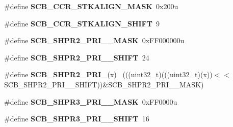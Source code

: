 \begin{DoxyCompactItemize}
\item 
\hypertarget{group___s_c_b___register___masks_ga41747ff80ad3657bcfa98a306feeee9d}{}\#define {\bfseries S\+C\+B\+\_\+\+C\+C\+R\+\_\+\+S\+T\+K\+A\+L\+I\+G\+N\+\_\+\+M\+A\+S\+K}~0x200u\label{group___s_c_b___register___masks_ga41747ff80ad3657bcfa98a306feeee9d}

\item 
\hypertarget{group___s_c_b___register___masks_ga217ffb9b976391961423e4a0802fbe66}{}\#define {\bfseries S\+C\+B\+\_\+\+C\+C\+R\+\_\+\+S\+T\+K\+A\+L\+I\+G\+N\+\_\+\+S\+H\+I\+F\+T}~9\label{group___s_c_b___register___masks_ga217ffb9b976391961423e4a0802fbe66}

\item 
\hypertarget{group___s_c_b___register___masks_ga3d791e5cf57bac7bf773150ba1f0683e}{}\#define {\bfseries S\+C\+B\+\_\+\+S\+H\+P\+R2\+\_\+\+P\+R\+I\+\_\+\_\+\+M\+A\+S\+K}~0x\+F\+F000000u\label{group___s_c_b___register___masks_ga3d791e5cf57bac7bf773150ba1f0683e}

\item 
\hypertarget{group___s_c_b___register___masks_ga4ccb3e607c07307c5ee1c749ff8da4ca}{}\#define {\bfseries S\+C\+B\+\_\+\+S\+H\+P\+R2\+\_\+\+P\+R\+I\+\_\+\_\+\+S\+H\+I\+F\+T}~24\label{group___s_c_b___register___masks_ga4ccb3e607c07307c5ee1c749ff8da4ca}

\item 
\hypertarget{group___s_c_b___register___masks_gafb1a543618040a0c1cde2d050554e99b}{}\#define {\bfseries S\+C\+B\+\_\+\+S\+H\+P\+R2\+\_\+\+P\+R\+I\+\_}(x)                                        ~(((uint32\+\_\+t)(((uint32\+\_\+t)(x))$<$$<$S\+C\+B\+\_\+\+S\+H\+P\+R2\+\_\+\+P\+R\+I\+\_\+\_\+\+S\+H\+I\+F\+T))\&S\+C\+B\+\_\+\+S\+H\+P\+R2\+\_\+\+P\+R\+I\+\_\+\_\+\+M\+A\+S\+K)\label{group___s_c_b___register___masks_gafb1a543618040a0c1cde2d050554e99b}

\item 
\hypertarget{group___s_c_b___register___masks_ga9f73cd19baa16589b1ea9b2049617e97}{}\#define {\bfseries S\+C\+B\+\_\+\+S\+H\+P\+R3\+\_\+\+P\+R\+I\+\_\+\_\+\+M\+A\+S\+K}~0x\+F\+F0000u\label{group___s_c_b___register___masks_ga9f73cd19baa16589b1ea9b2049617e97}

\item 
\hypertarget{group___s_c_b___register___masks_ga10c07d5bebf4f0032304b2d73da48a48}{}\#define {\bfseries S\+C\+B\+\_\+\+S\+H\+P\+R3\+\_\+\+P\+R\+I\+\_\+\_\+\+S\+H\+I\+F\+T}~16\label{group___s_c_b___register___masks_ga10c07d5bebf4f0032304b2d73da48a48}


\end{DoxyCompactItemize}
